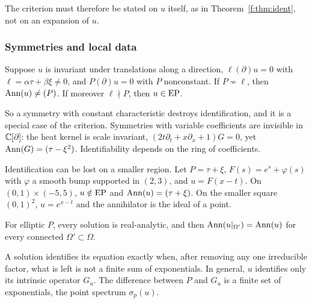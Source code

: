 The criterion must therefore be stated on $u$ itself, as in Theorem~\ref{f:thm:ident}, not on an expansion of $u$.

\subsubsection{Symmetries and local data}

\begin{proposition}\label{prop:sym}
Suppose $u$ is invariant under translations along a direction, $\ell(\partial)u=0$ with $\ell=\alpha\tau+\beta\xi\ne0$, and $P(\partial)u=0$ with $P$ nonconstant. If $P\not\sim\ell$, then $\operatorname{Ann}(u)\ne(P)$. If moreover $\ell\nmid P$, then $u\in\mathrm{EP}$.

\end{proposition}

So a symmetry with constant characteristic destroys identification, and it is a special case of the criterion. Symmetries with variable coefficients are invisible in $\mathbb{C}[\partial]$: the heat kernel is scale invariant, $(2t\partial_t+x\partial_x+1)G=0$, yet $\operatorname{Ann}(G)=(\tau-\xi^2)$. Identifiability depends on the ring of coefficients.

\begin{proposition}\label{prop:local}
Identification can be lost on a smaller region. Let $P=\tau+\xi$, $F(s)=e^s+\varphi(s)$ with $\varphi$ a smooth bump supported in $(2,3)$, and $u=F(x-t)$. On $(0,1)\times(-5,5)$, $u\notin\mathrm{EP}$ and $\operatorname{Ann}(u)=(\tau+\xi)$. On the smaller square $(0,1)^2$, $u=e^{x-t}$ and the annihilator is the ideal of a point.

For elliptic $P$, every solution is real-analytic, and then $\operatorname{Ann}(u|_{\Omega'})=\operatorname{Ann}(u)$ for every connected $\Omega'\subset\Omega$.

\end{proposition}

\begin{keypoint}
A solution identifies its equation exactly when, after removing any one irreducible factor, what is left is not a finite sum of exponentials. In general, $u$ identifies only its intrinsic operator $G_u$. The difference between $P$ and $G_u$ is a finite set of exponentials, the point spectrum $\sigma_p(u)$.
\end{keypoint}

